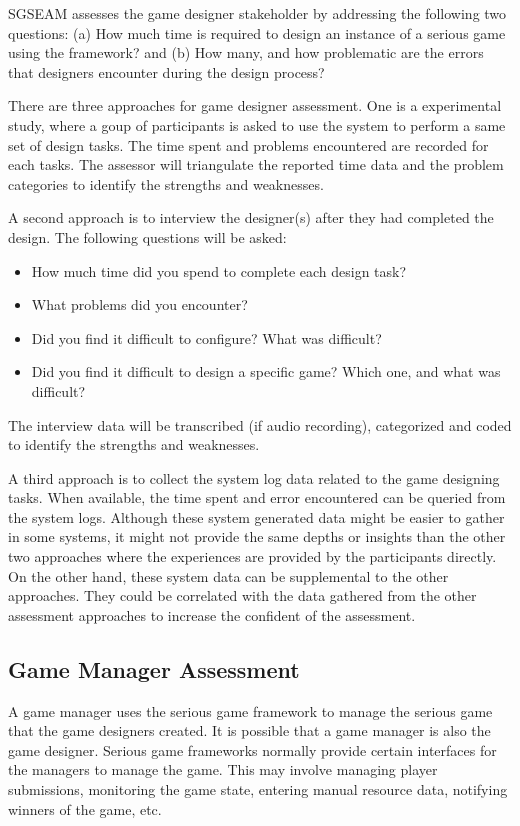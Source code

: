 \documentclass[11pt]{article}
\begin{document}
SGSEAM assesses the game designer stakeholder by addressing the following two questions: (a) How
much time is required to design an instance of a serious game using the framework? and (b) How
many, and how problematic are the errors that designers encounter during the design process?

There are three approaches for game designer assessment. One is a experimental study, where a
goup of participants is asked to use the system to perform a same set of design tasks. The time
spent and problems encountered are recorded for each tasks. The assessor will triangulate the
reported time data and the problem categories to identify the strengths and weaknesses.

A second approach is to interview the designer(s) after they had completed the design.
The following questions will be asked:
\begin{itemize}
\item How much time did you spend to complete each design task?
\item What problems did you encounter?
\item Did you find it difficult to configure? What was difficult?
\item Did you find it difficult to design a specific game? Which one, and what was difficult?
\end{itemize}

The interview data will be transcribed (if audio recording), categorized and coded to identify the
strengths and weaknesses.

A third approach is to collect the system log data related to the game designing tasks. When
available, the time spent and error encountered can be queried from the system logs. Although these
system generated data might be easier to gather in some systems, it might not provide the same
depths or insights than the other two approaches where the experiences are provided by the
participants directly. On the other hand, these system data can be supplemental to the other
approaches. They could be correlated with the data gathered from the other assessment approaches
 to increase the confident of the assessment.

\subsection{Game Manager Assessment}

A game manager uses the serious game framework to manage the serious game that the game
designers created. It is possible that a game manager is also the game designer.
Serious game frameworks normally provide certain interfaces for the managers to manage the
game. This may involve managing player submissions, monitoring the game state, entering
manual resource data, notifying winners of the game, etc.
\end{document}
